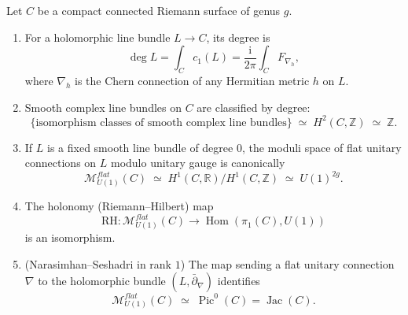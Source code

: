\documentclass[12pt,letterpaper,reqno]{amsart}
\numberwithin{equation}{section}
\newcommand{\cM}{\ensuremath{\mathcal M}}
\newcommand{\bbR}{\ensuremath{\mathbb R}}
\newcommand{\bbZ}{\ensuremath{\mathbb Z}}
\newcommand{\I}{{\mathrm i}}
\DeclareMathOperator{\Hom}{Hom}
\DeclareMathOperator{\Jac}{Jac}
\begin{document}
\begin{prop}
Let $C$ be a compact connected Riemann surface of genus $g$.
\begin{enumerate}
\item For a holomorphic line bundle $L \to C$, its degree is
\[
\deg L = \int_C c_1(L) = \frac{\I}{2\pi}\int_C F_{\nabla_h},
\]
where $\nabla_h$ is the Chern connection of any Hermitian metric $h$ on $L$.
\item Smooth complex line bundles on $C$ are classified by degree:
\[
\{\text{isomorphism classes of smooth complex line bundles}\}
\;\simeq\; H^2(C,\bbZ)\;\simeq\;\bbZ.
\]
\item If $L$ is a fixed smooth line bundle of degree $0$, the moduli space of flat unitary
connections on $L$ modulo unitary gauge is canonically
\[
\cM^{flat}_{U(1)}(C) \;\simeq\; H^1(C,\bbR)/H^1(C,\bbZ)\;\simeq\; U(1)^{2g}.
\]
\item The holonomy (Riemann--Hilbert) map
\[
\mathrm{RH}:\cM^{flat}_{U(1)}(C)\longrightarrow \Hom(\pi_1(C),U(1))
\]
is an isomorphism.
\item (Narasimhan--Seshadri in rank $1$) The map sending a flat unitary connection
$\nabla$ to the holomorphic bundle $(L,\bar\partial_\nabla)$ identifies
\[
\cM^{flat}_{U(1)}(C)\;\simeq\;\operatorname{Pic}^0(C)=\Jac(C).
\]
\end{enumerate}
\end{prop}
\end{document}

